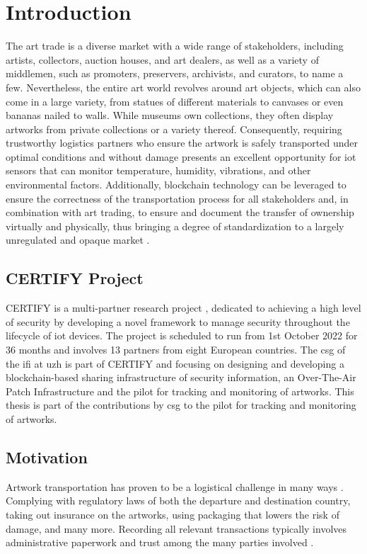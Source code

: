 \chapter{Introduction}
\label{chap:introduction}
The art trade is a diverse market with a wide range of stakeholders, including artists, collectors, auction houses, and art dealers, as well as a variety of middlemen, such as promoters, preservers, archivists, and curators, to name a few. Nevertheless, the entire art world revolves around art objects, which can also come in a large variety, from statues of different materials to canvases or even bananas nailed to walls. While museums own collections, they often display artworks from private collections or a variety thereof. Consequently, requiring trustworthy logistics partners who ensure the artwork is safely transported under optimal conditions and without damage presents an excellent opportunity for \gls{iot} sensors that can monitor temperature, humidity, vibrations, and other environmental factors. Additionally, blockchain technology can be leveraged to ensure the correctness of the transportation process for all stakeholders and, in combination with art trading, to ensure and document the transfer of ownership virtually and physically, thus bringing a degree of standardization to a largely unregulated and opaque market \cite{certify}.

\section{CERTIFY Project}
\label{sec:certify}
CERTIFY is a multi-partner research project \cite{certify}, dedicated to achieving a high level of security by developing a novel framework to manage security throughout the lifecycle of \gls{iot} devices. The project is scheduled to run from 1st October 2022 for 36 months and involves 13 partners from eight European countries. The \gls{csg} of the \gls{ifi} at \gls{uzh} is part of CERTIFY and focusing on designing and developing a blockchain-based sharing infrastructure of security information, an Over-The-Air Patch Infrastructure and the pilot for tracking and monitoring of artworks. This thesis is part of the contributions by \gls{csg} to the pilot for tracking and monitoring of artworks.

\section{Motivation}
Artwork transportation has proven to be a logistical challenge in many ways \cite{artintransit}. Complying with regulatory laws of both the departure and destination country, taking out insurance on the artworks, using packaging that lowers the risk of damage, and many more. Recording all relevant transactions typically involves administrative paperwork and trust among the many parties involved \cite{artintransit}.

